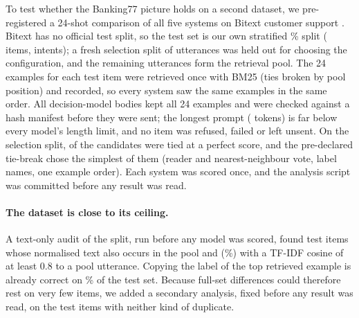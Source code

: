 To test whether the Banking77 picture holds on a second dataset, we pre-registered a 24-shot comparison of all five
systems on Bitext customer support \citep{bitext-2023-customer-support}. Bitext has no official test split, so the
test set is our own stratified \btTestPct\% split (\btN{} items, \btK{} intents); a fresh selection split of
\btSelN{} utterances was held out for choosing the \orb{} configuration, and the remaining \btPoolN{} utterances form
the retrieval pool. The 24 examples for each test item were retrieved once with BM25 (ties broken by pool position)
and recorded, so every system saw the same examples in the same order. All \btN{} decision-model bodies kept all 24
examples and were checked against a hash manifest before they were sent; the longest prompt (\btMaxPromptTokens{}
tokens) is far below every model's length limit, and no item was refused, failed or left unsent. On the selection
split, \btSelTied{} of the \btCandidates{} \orb{} candidates were tied at a perfect score, and the pre-declared
tie-break chose the simplest of them (reader and nearest-neighbour vote, label names, one example order). Each
system was scored once, and the analysis script was committed before any result was read.

\paragraph{The dataset is close to its ceiling.} A text-only audit of the split, run before any model was scored,
found \btExactDup{} test items whose normalised text also occurs in the pool and \btNearDup{} (\btNearDupPct\%) with
a TF-IDF cosine of at least 0.8 to a pool utterance. %
Copying the label of the top retrieved example is already correct on \btFloorAcc\% of the test set. Because
full-set differences could therefore rest on very few items, we added a secondary analysis, fixed before any result
was read, on the \btNSub{} test items with neither kind of duplicate.

